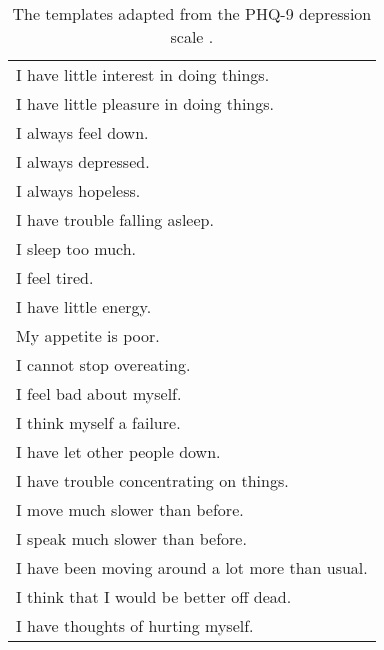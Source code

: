   \begin{table}
    \centering
    \small
    \begin{tabular}{l}
      \hline
      I have little interest in doing things. \\
      I have little pleasure in doing things. \\
      I always feel down. \\
      I always depressed. \\
      I always hopeless. \\
      I have trouble falling asleep. \\
      I sleep too much. \\
      I feel tired. \\
      I have little energy. \\
      My appetite is poor. \\
      I cannot stop overeating. \\
      I feel bad about myself. \\
      I think myself a failure. \\
      I have let other people down. \\
      I have trouble concentrating on things. \\
      I move much slower than before. \\
      I speak much slower than before. \\
      I have been moving around a lot more than usual. \\
      I think that I would be better off dead. \\
      I have thoughts of hurting myself. \\
      \hline
    \end{tabular}
    \caption{\label{tab:PHQ-9} The templates adapted from the PHQ-9 depression scale \citep{kroenke2001phq}. }
  \end{table}